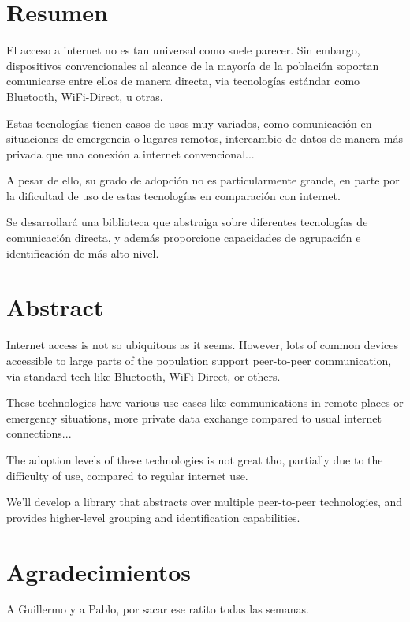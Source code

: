 \section*{Resumen}

El acceso a internet no es tan universal como suele parecer. Sin embargo,
dispositivos convencionales al alcance de la mayoría de la población soportan
comunicarse entre ellos de manera directa, via tecnologías estándar como
Bluetooth, WiFi-Direct, u otras.

Estas tecnologías tienen casos de usos muy variados, como comunicación en
situaciones de emergencia o lugares remotos, intercambio de datos de manera más
privada que una conexión a internet convencional...

A pesar de ello, su grado de adopción no es particularmente grande, en parte
por la dificultad de uso de estas tecnologías en comparación con internet.

Se desarrollará una biblioteca que abstraiga sobre diferentes tecnologías de
comunicación directa, y además proporcione capacidades de agrupación e
identificación de más alto nivel.

\clearpage

\section*{Abstract}

Internet access is not so ubiquitous as it seems. However, lots of common
devices accessible to large parts of the population support peer-to-peer
communication, via standard tech like Bluetooth, WiFi-Direct, or others.

These technologies have various use cases like communications in remote places
or emergency situations, more private data exchange compared to usual internet
connections...

The adoption levels of these technologies is not great tho, partially due to
the difficulty of use, compared to regular internet use.

We'll develop a library that abstracts over multiple peer-to-peer technologies,
and provides higher-level grouping and identification capabilities.

\clearpage

\printglossaries

\clearpage

\section*{Agradecimientos}

A Guillermo y a Pablo, por sacar ese ratito todas las semanas.
